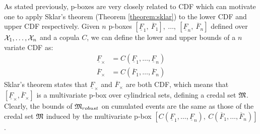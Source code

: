 As stated previously, p-boxes are very closely related to CDF which can motivate one to apply Sklar's theorem (Theorem \ref{theorem:sklar}) to the lower CDF and upper CDF respectively. Given $n$ p-boxes $[\underline{F}_1,~\overline{F}_1],~\dots,~[\underline{F}_n,~\overline{F}_n]$ defined over ${\mathcal{X}}_1,\dots,{\mathcal{X}}_n$ and a copula $C$, we can define the lower and upper bounds of a $n$ variate CDF as:
\begin{align*}
    \underline{F}_\times&=C(\underline{F}_1,\dots, \underline{F}_n)\\
    \overline{F}_\times&=C(\overline{F}_1,\dots, \overline{F}_n)
\end{align*}
Sklar's theorem states that $\underline{F}_\times$ and $\overline{F}_\times$ are both CDF, which means that $[\underline{F}_\times, \overline{F}_\times]$ is a multivariate p-box \cite{pelessoni_bivariate_2016, montes_sklars_2015} over cylindrical sets, defining a credal set ${\mathfrak{M}}$. Clearly, the bounds of ${\mathfrak{M}}_{robust}$ on cumulated events are the same as those of the credal set ${\mathfrak{M}}$ induced by the multivariate p-box $[C(\underline{F}_1,\dots, \underline{F}_n),~C(\overline{F}_1,\dots, \overline{F}_n)]$.

